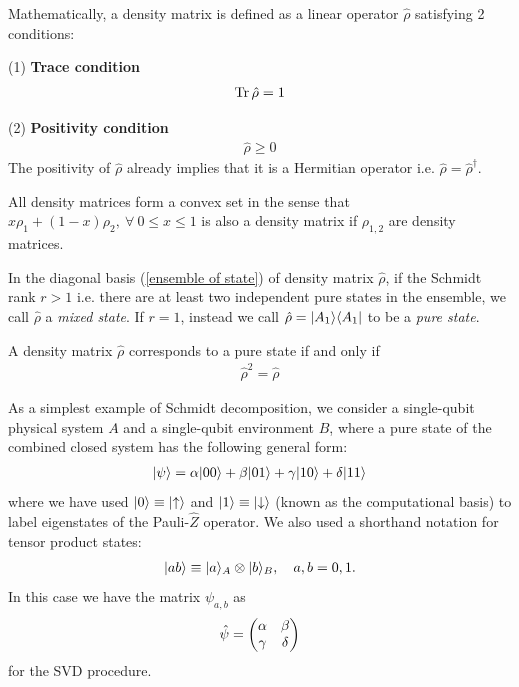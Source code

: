 Mathematically, a density matrix is defined as a linear operator $\hat\rho$ satisfying 2 conditions:

(1) \textbf{Trace condition} 
\begin{align}
\operatorname{Tr}\hat\rho=1
\end{align}

(2) \textbf{Positivity condition}
\begin{align}
\hat\rho\geq0
\end{align}
The positivity of $\hat\rho$ already implies that it is a Hermitian operator i.e. $\hat\rho=\hat\rho^\dagger$. 

All density matrices form a convex set in the sense that $x\rho_1+(1-x)\rho_2,~\forall~0\leq x\leq1$ is also a density matrix if $\rho_{1,2}$ are density matrices. 

In the diagonal basis (\ref{ensemble of state}) of density matrix $\hat \rho$, if the Schmidt rank $r>1$ i.e. there are at least two independent pure states in the ensemble, we call $\hat\rho$ a \emph{mixed state}. If $r=1$, instead we call $\hat\rho=|{A_1}\rangle\langle{A_1}|$ to be a \emph{pure state}. 
\begin{thm}
    A density matrix $\hat\rho$ corresponds to a pure state if and only if 
\begin{align}
    {\hat\rho}^2=\hat\rho
\end{align}
\end{thm}


As a simplest example of Schmidt decomposition, we consider a single-qubit physical system $A$ and a single-qubit environment $B$, where a pure state of the combined closed system has the following general form:
\begin{align}
|{\psi}\rangle=\alpha|{00}\rangle+\beta|{01}\rangle+\gamma|{10}\rangle+\delta|{11}\rangle
\end{align}
where we have used $|{0}\rangle\equiv|{\uparrow}\rangle$ and $|{1}\rangle\equiv|{\downarrow}\rangle$ (known as the computational basis) to label eigenstates of the Pauli-$\hat Z$ operator. We also used a shorthand notation for tensor product states:
\begin{align}
|{ab}\rangle\equiv|{a}\rangle_A\otimes|{b}\rangle_B,~~~a,b=0,1.
\end{align}
In this case we have the matrix $\psi_{a,b}$ as
\begin{align}
\hat\psi=\begin{pmatrix} \alpha&\beta\\ \gamma&\delta\end{pmatrix}
\end{align}
for the SVD procedure.  

